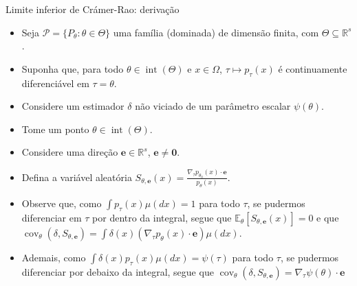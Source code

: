 \documentclass[11pt]{beamer}
\begin{document}
	\begin{frame}{Limite inferior de Crámer-Rao: derivação}
		\begin{itemize}
				\item Seja $\mathcal{P} = \{P_\theta : \theta  \in \Theta\}$ uma família (dominada) de dimensão finita, com $\Theta \subseteq \mathbb{R}^s$.
				\item Suponha que, para todo $\theta \in \operatorname{int}(\Theta)$ e $x \in \Omega$, $\tau \mapsto p_\tau(x)$ é continuamente diferenciável em $\tau = \theta$.
			\item Considere um estimador $\delta$ não viciado de um parâmetro escalar $\psi(\theta)$.
			\item Tome um ponto $\theta \in \operatorname{int}(\Theta)$.
			
			\item Considere uma direção $\boldsymbol{e} \in \mathbb{R}^s$, $\boldsymbol{e} \neq \boldsymbol{0}$.
			\item Defina a variável aleatória $S_{\theta,\boldsymbol{e}}(x) = \frac{\nabla_{\tau} p_{\theta_0}(x) \cdot \boldsymbol{e}}{p_{\theta}(x)}$.
				\item Observe que, como $\int p_{\tau}(x)\mu(dx)=1$ para todo $\tau$, se pudermos diferenciar em $\tau$ por dentro da integral, segue que $\mathbb{E}_{\theta}[S_{\theta,\boldsymbol{e}}(x)] = 0$ e que $\operatorname{cov}_{\theta}(\delta, S_{\theta,\boldsymbol{e}}) = \int\delta(x)  (\nabla_{\tau} p_{\theta}(x) \cdot \boldsymbol{e})  \mu(dx)$.
				\item Ademais, como $\int \delta(x) p_\tau(x) \mu(dx) =\psi(\tau) $ para todo $\tau$, se pudermos diferenciar por debaixo da integral, segue que $   \operatorname{cov}_{\theta}(\delta, S_{\theta,\boldsymbol{e}}) =\nabla_{\tau}\psi(\theta) \cdot \boldsymbol{e}$
			
		\end{itemize}

		
	
		
	\end{frame}
	
\end{document}

